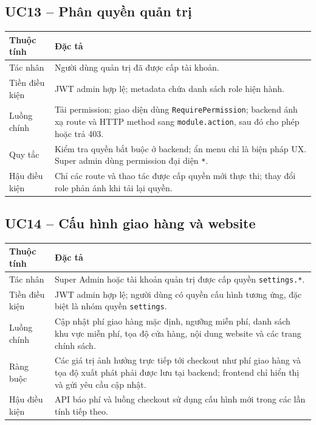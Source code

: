 \subsection{UC13 -- Phân quyền quản trị}

\begin{longtable}{@{}L{0.23\textwidth}L{0.69\textwidth}@{}}
  \toprule
  \textbf{Thuộc tính} & \textbf{Đặc tả} \\
  \midrule
  Tác nhân & Người dùng quản trị đã được cấp tài khoản. \\
  Tiền điều kiện & JWT admin hợp lệ; metadata chứa danh sách role hiện hành. \\
  Luồng chính & Tải permission; giao diện dùng \texttt{RequirePermission}; backend ánh xạ route và HTTP method sang \texttt{module.action}, sau đó cho phép hoặc trả 403. \\
  Quy tắc & Kiểm tra quyền bắt buộc ở backend; ẩn menu chỉ là biện pháp UX. Super admin dùng permission đại diện \texttt{*}. \\
  Hậu điều kiện & Chỉ các route và thao tác được cấp quyền mới thực thi; thay đổi role phản ánh khi tải lại quyền. \\
  \bottomrule
\end{longtable}

\subsection{UC14 -- Cấu hình giao hàng và website}

\begin{longtable}{@{}L{0.23\textwidth}L{0.69\textwidth}@{}}
  \toprule
  \textbf{Thuộc tính} & \textbf{Đặc tả} \\
  \midrule
  Tác nhân & Super Admin hoặc tài khoản quản trị được cấp quyền \texttt{settings.*}. \\
  Tiền điều kiện & JWT admin hợp lệ; người dùng có quyền cấu hình tương ứng, đặc biệt là nhóm quyền \texttt{settings}. \\
  Luồng chính & Cập nhật phí giao hàng mặc định, ngưỡng miễn phí, danh sách khu vực miễn phí, tọa độ cửa hàng, nội dung website và các trang chính sách. \\
  Ràng buộc & Các giá trị ảnh hưởng trực tiếp tới checkout như phí giao hàng và tọa độ xuất phát phải được lưu tại backend; frontend chỉ hiển thị và gửi yêu cầu cập nhật. \\
  Hậu điều kiện & API báo phí và luồng checkout sử dụng cấu hình mới trong các lần tính tiếp theo. \\
  \bottomrule
\end{longtable}

